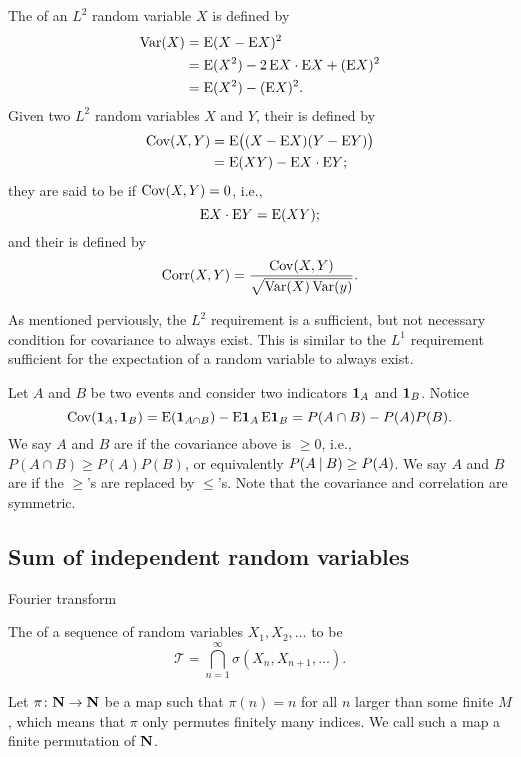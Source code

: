 \begin{defn}
    The  of an $L^2$ random variable $X$ is defined by \begin{align*}
    \Var(X) & = \E(X - \E X)^2 \\
    & = \E (X^2) - 2 \E X\cdot \E X + (\E X)^2 \\
    & = \E(X^2) - (\E X)^2.
    \end{align*}
    Given two $L^2$ random variables $X$ and $Y$, their  is defined by\begin{align*}
        \operatorname{Cov}(X,Y) & = \mathop{}\!\mathrm{E}\bigl((X - \mathop{}\!\mathrm{E} X)(Y - \mathop{}\!\mathrm{E} Y)\bigr) \\
        & = \mathop{}\!\mathrm{E} (XY) - \mathop{}\!\mathrm{E} X \cdot \mathop{}\!\mathrm{E} Y;
    \end{align*} they are said to be  if $\operatorname{Cov}(X,Y) = 0$, i.e., 
    \[\mathop{}\!\mathrm{E} X \cdot \mathop{}\!\mathrm{E} Y = \mathop{}\!\mathrm{E}(XY);\] and their  is defined by \[
    	\operatorname{Corr}(X,Y) = \frac{\operatorname{Cov}(X,Y)}{\sqrt{\operatorname{Var}(X)\operatorname{Var}(y)}}.
    \]
    
\end{defn}

As mentioned perviously, the $L^2$ requirement is a sufficient, but not necessary condition for covariance to always exist. This is similar to the $L^1$ requirement sufficient for the expectation of a random variable to always exist.

Let $A$ and $B$ be two events and consider two indicators $\mathbf{1}_A$ and $\mathbf{1}_B$. Notice \[
    \operatorname{Cov}(\mathbf{1}_A,\mathbf{1}_B) = \mathop{}\!\mathrm{E}(\mathbf{1}_{A\cap B}) - \mathop{}\!\mathrm{E}\mathbf{1}_{A} \mathop{}\!\mathrm{E}\mathbf{1}_{B} = P(A\cap B) - P(A) P(B).
\]
We say $A$ and $B$ are  if the covariance above is $\geq 0$, i.e., $P(A\cap B) \geq P(A) P(B)$, or equivalently $P(A \mathbin{|} B) \geq P(A)$. We say $A$ and $B$ are  if the $\geq$'s are replaced by $\leq$'s. Note that the covariance and correlation are symmetric.

\subsection{Sum of independent random variables}
Fourier transform

The  of a sequence of random variables $X_1,X_2,\dotsc$ to be \[
    \mathcal{T} = \bigcap_{n=1}^\infty \sigma(X_n,X_{n+1},\dotsc).
\]

Let $\pi\colon \mathbf{N} \to \mathbf{N}$ be a map such that $\pi(n) = n$ for all $n$ larger than some finite $M$, which means that $\pi$ only permutes finitely many indices. We call such a map a finite permutation of $\mathbf{N}$.

